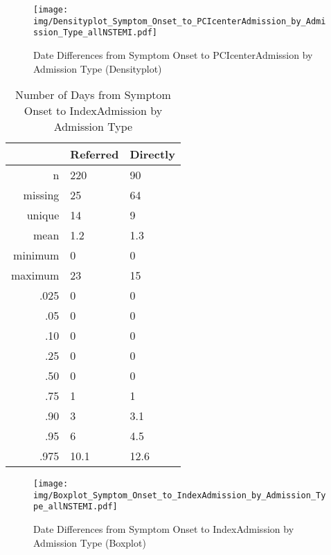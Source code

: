 \documentclass[presentation,xcolor=pdftex,dvipsnames,table,11pt]{beamer}
\begin{document}
\begin{tiny}
\begin{frame}
\begin{figure}
  \centering
  \caption{Date Differences from Symptom Onset to PCIcenterAdmission by Admission Type (Densityplot)}
  \label{Density: Date Differences from Symptom Onset to PCIcenterAdmission by Admission Type}
\texttt{[image: img/Densityplot\_Symptom\_Onset\_to\_PCIcenterAdmission\_by\_Admission\_Type\_allNSTEMI.pdf]}\end{figure}
\end{frame}



\begin{frame}
\begin{table}[ht]
\centering
\begin{tabular}{rll}
  \toprule
 & Referred & Directly \\ 
  \midrule
n & 220 & 90 \\ 
  missing & 25 & 64 \\ 
  unique & 14 & 9 \\ 
  mean & 1.2 & 1.3 \\ 
  minimum & 0 & 0 \\ 
  maximum & 23 & 15 \\ 
  .025 & 0 & 0 \\ 
  .05 & 0 & 0 \\ 
  .10 & 0 & 0 \\ 
  .25 & 0 & 0 \\ 
  .50 & 0 & 0 \\ 
  .75 & 1 & 1 \\ 
  .90 & 3 & 3.1 \\ 
  .95 & 6 & 4.5 \\ 
  .975 & 10.1 & 12.6 \\ 
   \bottomrule
\end{tabular}
\caption{Number of Days from Symptom Onset to IndexAdmission by Admission Type} 
\end{table}\end{frame}


\begin{frame}
\begin{figure}
  \centering
  \caption{Date Differences from Symptom Onset to IndexAdmission by Admission Type (Boxplot)}
  \label{Boxplot: Date Differences from Symptom Onset to IndexAdmission by Admission Type}
\texttt{[image: img/Boxplot\_Symptom\_Onset\_to\_IndexAdmission\_by\_Admission\_Type\_allNSTEMI.pdf]}\end{figure}
\end{frame}



\end{tiny}
\end{document}
